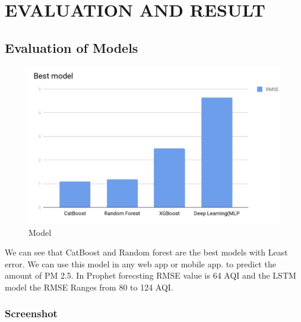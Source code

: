 \chapter{EVALUATION AND RESULT}

\section{Evaluation of Models}

\begin{figure}[h]
\label{bd}
\centering
\includegraphics[width= 14 cm]{best_model.jpg}
\caption{Model}
\end{figure}
We can see that CatBoost and Random forest are the best models with Least error. We can use this model in any web app or mobile app.
to predict the amount of PM 2.5. In Prophet forecsting RMSE value is 64 AQI and the LSTM model the RMSE Ranges from 80 to 124 AQI.
\pagebreak
\subsection{Screenshot}

